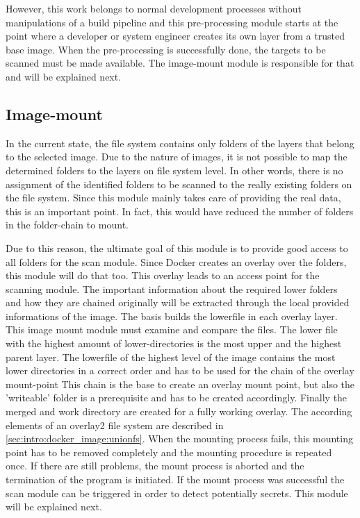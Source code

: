 However, this work belongs to normal development processes without manipulations of a build pipeline and this pre-processing module starts at the point where a developer or system engineer creates its own layer from a trusted base image. When the pre-processing is successfully done, the targets to be scanned must be made available. The image-mount module is responsible for that and will be explained next.

\subsection{Image-mount}
\label{ch:theory:analysing_process:imgmount}
In the current state, the file system contains only folders of the layers that belong to the selected image.
Due to the nature of images, it is not possible to map the determined folders to the layers on file system level. In other words, there is no assignment of the identified folders to be scanned to the really existing folders on the file system.
Since this module mainly takes care of providing the real data, this is an important point. In fact, this would have reduced the number of folders in the folder-chain to mount. 

Due to this reason, the ultimate goal of this module is to provide good access to all folders for the scan module. Since Docker creates an overlay over the folders, this module will do that too. This overlay leads to an access point for the scanning module. The important information about the required lower folders and how they are chained originally will be extracted through the local provided informations of the image. The basis builds the lowerfile in each overlay layer. This image mount module must examine and compare the files. The lower file with the highest amount of lower-directories is the most upper and the highest parent layer.
The lowerfile of the highest level of the image contains the most lower directories in a correct order and has to be used for the chain of the overlay mount-point
This chain is the base to create an overlay mount point, but also the 'writeable' folder is a prerequisite and has to be created accordingly. Finally the merged and work directory are created for a fully working overlay. The according elements of an overlay2 file system are described in \ref{sec:intro:docker_image:unionfs}. When the mounting process fails, this mounting point has to be removed completely and the mounting procedure is repeated once. If there are still problems, the mount process is aborted and the termination of the program is initiated. If the mount process was successful the scan module can be triggered in order to detect potentially secrets. This module will be explained next.

